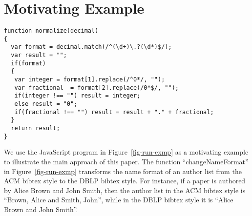 
\section{Motivating Example}\label{sec:mot}

\begin{figure*}[htbp]
\begin{center}
\begin{verbatim}
function normalize(decimal)
{
  var format = decimal.match(/^(\d+)\.?(\d*)$/);
  var result = "";
  if(format)
  {
   var integer = format[1].replace(/^0*/, "");
   var fractional  = format[2].replace(/0*$/, "");
   if(integer !== "") result = integer;
   else result = "0"; 
   if(fractional !== "") result = result + "." + fractional;
  }
  return result;
}
\end{verbatim}
\end{center}
\caption{Normalize a decimal by removing the leading and trailing zeros}
\label{fig-run-exmp}
\end{figure*}


We use the JavaScript program in Figure~\ref{fig-run-exmp} as a motivating example to illustrate the main approach of this paper. 
The function ``changeNameFormat''  in Figure~\ref{fig-run-exmp} transforms the name format of an author list from the ACM bibtex style to the DBLP bibtex style. For instance,  if a paper is authored by Alice Brown and John Smith, then the author list in the ACM bibtex style is ``Brown, Alice and Smith, John'', while  in the DBLP bibtex style it is ``Alice Brown and John Smith''. 



